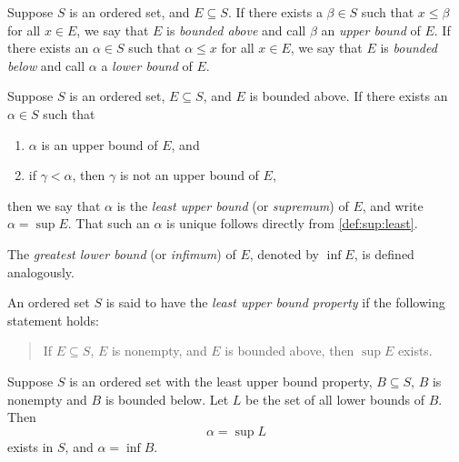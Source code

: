 \begin{definition}
    \label{def:upper-bound}
    Suppose \(S\) is an ordered set, and \(E \subseteq S\). If there exists a \(\beta \in S\) such that \(x \leq \beta\) for all \(x \in E\), we say that \(E\) is \emph{bounded above} and call \(\beta\) an \emph{upper bound} of \(E\). If there exists an \(\alpha \in S\) such that \(\alpha \leq x\) for all \(x \in E\), we say that \(E\) is \emph{bounded below} and call \(\alpha\) a \emph{lower bound} of \(E\).
\end{definition}

\begin{definition}
    \label{def:supremum}
    Suppose \(S\) is an ordered set, \(E \subseteq S\), and \(E\) is bounded above. If there exists an \(\alpha \in S\) such that
    \begin{enumerate}[label=(\alph*), wide]
        \item \(\alpha\) is an upper bound of \(E\), and
        \item if \(\gamma < \alpha\), then \(\gamma\) is not an upper bound of \(E\),\label{def:sup:least}
    \end{enumerate}
    then we say that \(\alpha\) is the \emph{least upper bound} (or \emph{supremum}) of \(E\), and write \(\alpha = \sup E\). That such an \(\alpha\) is unique follows directly from \ref{def:sup:least}.

    The \emph{greatest lower bound} (or \emph{infimum}) of \(E\), denoted by \(\inf E\), is defined analogously.
\end{definition}

\begin{definition}
    \label{def:lub-property}
    An ordered set \(S\) is said to have the \emph{least upper bound property} if the following statement holds:
    \begin{quotation}
        \quad If \(E \subseteq S\), \(E\) is nonempty, and \(E\) is bounded above, then \(\sup E\) exists.
    \end{quotation}
\end{definition}

\begin{theorem}
    Suppose \(S\) is an ordered set with the least upper bound property, \(B \subseteq S\), \(B\) is nonempty and \(B\) is bounded below. Let \(L\) be the set of all lower bounds of \(B\). Then
    \[
        \alpha = \sup L
    \]
    exists in \(S\), and \(\alpha = \inf B\).
\end{theorem}

